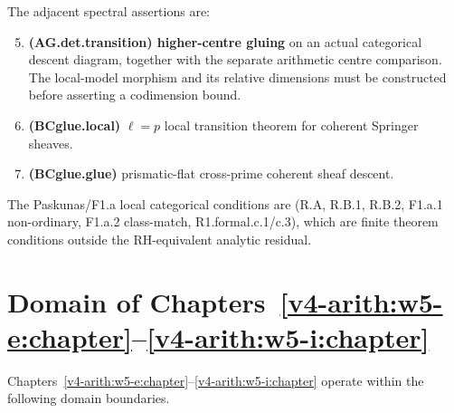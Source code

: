 The adjacent spectral assertions are:

\begin{enumerate}
\setcounter{enumi}{4}
\item \textbf{(AG.det.transition) higher-centre gluing} on an
actual categorical descent diagram, together with the separate
arithmetic centre comparison. The local-model morphism and its
relative dimensions must be constructed before asserting a
codimension bound.
\item \textbf{(BCglue.local)} \(\ell=p\) local transition theorem
for coherent Springer sheaves.
\item \textbf{(BCglue.glue)} prismatic-flat cross-prime coherent
sheaf descent.
\end{enumerate}

The Paskunas/F1.a local categorical conditions are (R.A, R.B.1,
R.B.2, F1.a.1 non-ordinary, F1.a.2 class-match, R1.formal.c.1/c.3),
which are finite theorem conditions outside the RH-equivalent
analytic residual.

\section{Domain of Chapters~\ref{v4-arith:w5-e:chapter}--\ref{v4-arith:w5-i:chapter}}
\label{v4-arith:w5-synth:does-not-do}

Chapters~\ref{v4-arith:w5-e:chapter}--\ref{v4-arith:w5-i:chapter} operate within the following domain boundaries.


